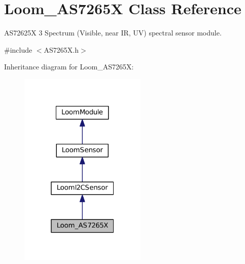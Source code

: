 \hypertarget{class_loom___a_s7265_x}{}\section{Loom\+\_\+\+A\+S7265X Class Reference}
\label{class_loom___a_s7265_x}


A\+S72625X 3 Spectrum (Visible, near IR, UV) spectral sensor module.  




{\ttfamily \#include $<$A\+S7265\+X.\+h$>$}



Inheritance diagram for Loom\+\_\+\+A\+S7265X\+:\nopagebreak
\begin{figure}[H]
\begin{center}
\leavevmode
\includegraphics[width=172pt]{class_loom___a_s7265_x__inherit__graph}
\end{center}
\end{figure}
